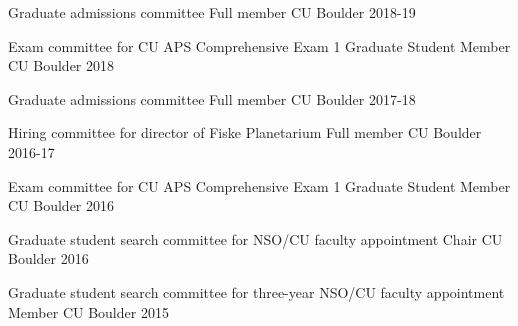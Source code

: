 

\begin{cvhonors}

  \cvhonor
	{Graduate admissions committee}
  	{Full member}
	{CU Boulder}
	{2018-19}

  \cvhonor
	{Exam committee for CU APS Comprehensive Exam 1}
  	{Graduate Student Member}
	{CU Boulder}
	{2018}

  \cvhonor
	{Graduate admissions committee}
  	{Full member}
	{CU Boulder}
	{2017-18}

  \cvhonor
	{Hiring committee for director of Fiske Planetarium}
  	{Full member}
	{CU Boulder}
	{2016-17}

  \cvhonor
	{Exam committee for CU APS Comprehensive Exam 1}
  	{Graduate Student Member}
	{CU Boulder}
	{2016}

  \cvhonor
    {Graduate student search committee for NSO/CU faculty appointment} %
    {Chair} %
    {CU Boulder} %
    {2016} %

  \cvhonor
    {Graduate student search committee for three-year NSO/CU faculty appointment} %
    {Member} %
    {CU Boulder} %
    {2015} %

\end{cvhonors}
